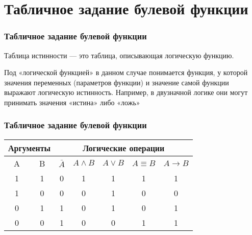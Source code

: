 \documentclass[14pt]{beamer}
\begin{document}
\section{Табличное задание булевой функции}
\begin{frame}
\frametitle{\small Табличное задание булевой функции}

Таблица истинности — это таблица, описывающая логическую функцию.
  
  
Под «логической функцией» в данном случае понимается функция, у которой значения переменных (параметров функции) и значение самой функции выражают логическую истинность. Например, в двузначной логике они могут принимать значения «истина» либо «ложь» 



\end{frame}


\begin{frame}
\frametitle{\small Табличное задание булевой функции}


\begin{table}[h]
\renewcommand{\tabcolsep}{0.15cm} %


\begin{tabular}{|c|c|c|c|c|c|c}
\hline %

\multicolumn{2}{|c|}{Аргументы} & \multicolumn{5}{|c|}{Логические операции} \\
\hline

\rule{0cm}{0.5cm}%

A  & B & 
$ \bar{A} $ & 
$A \land B $ & 
$A \lor B $ & 
$ A \equiv B $ &
$A \to B $ \\
\hline
  
   1 & 1 & 0 & 1 & 1 & 1 & 1  \\
   1 & 0 & 0 & 0 & 1 & 0 & 0  \\
   0 & 1 & 1 & 0 & 1 & 0 & 1  \\
   0 & 0 & 1 & 0 & 0 & 1 & 1  \\
  
\hline
 
\end{tabular}
\end{table} 


\end{frame}

\end{document}
